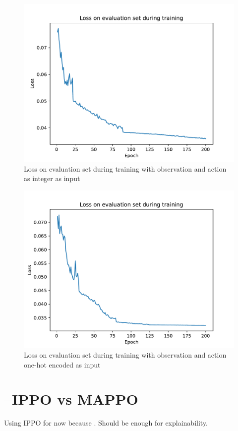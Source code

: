 \documentclass[UKenglish]{uiomasterthesis}
\begin{document}
\begin{figure}[!ht]
	\includegraphics[width=\columnwidth]{images/pred_model_action.pdf}
	\caption{Loss on evaluation set during training with observation and action as integer as input}
	\label{fig:intgrad} 
\end{figure}

\begin{figure}[!ht]
	\includegraphics[width=\columnwidth]{images/pred_model_one-hot.pdf}
	\caption{Loss on evaluation set during training with observation and action one-hot encoded as input}
	\label{fig:intgrad} 
\end{figure}

\section{--IPPO vs MAPPO}
Using IPPO for now because \cite{dewitt2020independentlearningneedstarcraft}. Should be enough for explainability.
\end{document}
